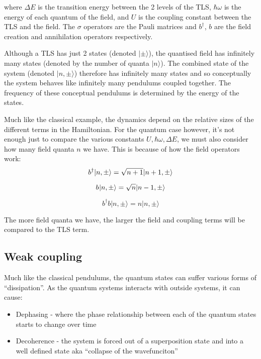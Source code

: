 \documentclass[
]{article}
\renewcommand{\[}{\begin{equation}}
\renewcommand{\]}{\end{equation}}
\providecommand{\tightlist}{%
  \setlength{\itemsep}{0pt}\setlength{\parskip}{0pt}}
\begin{document}
where \(\Delta E\) is the transition energy between the 2 levels of the
TLS, \(\hbar\omega\) is the energy of each quantum of the field, and
\(U\) is the coupling constant between the TLS and the field. The
\(\sigma\) operators are the Pauli matrices and \(b^{\dagger}\), \(b\)
are the field creation and annihilation operators respectively.

Although a TLS has just 2 states (denoted \(|\pm\rangle\)), the
quantised field has infinitely many states (denoted by the number of
quanta \(|n\rangle\)). The combined state of the system (denoted
\(|n, \pm\rangle\)) therefore has infinitely many states and so
conceptually the system behaves like infinitely many pendulums coupled
together. The frequency of these conceptual pendulums is determined by
the energy of the states.

Much like the classical example, the dynamics depend on the relative
sizes of the different terms in the Hamiltonian. For the quantum case
however, it's not enough just to compare the various constants
\(U, \hbar \omega, \Delta E\), we must also consider how many field
quanta \(n\) we have. This is because of how the field operators work:
\[
b^{\dagger} |n,\pm\rangle = \sqrt{n+1}|n+1,\pm\rangle \\
\]

\[
b^{} |n,\pm\rangle = \sqrt{n}|n-1,\pm\rangle \\
\]

\[
b^{\dagger}b |n,\pm\rangle = n|n,\pm\rangle
\]

The more field quanta we have, the larger the field and coupling terms
will be compared to the TLS term.

\subsection{Weak coupling}\label{weak-coupling-1}

Much like the classical pendulums, the quantum states can suffer various
forms of ``dissipation''. As the quantum systems interacts with outside
systems, it can cause:

\begin{itemize}
\tightlist
\item
  Dephasing - where the phase relationship between each of the quantum
  states starts to change over time
\item
  Decoherence - the system is forced out of a superposition state and
  into a well defined state aka ``collapse of the wavefunciton''
\end{itemize}
\end{document}
